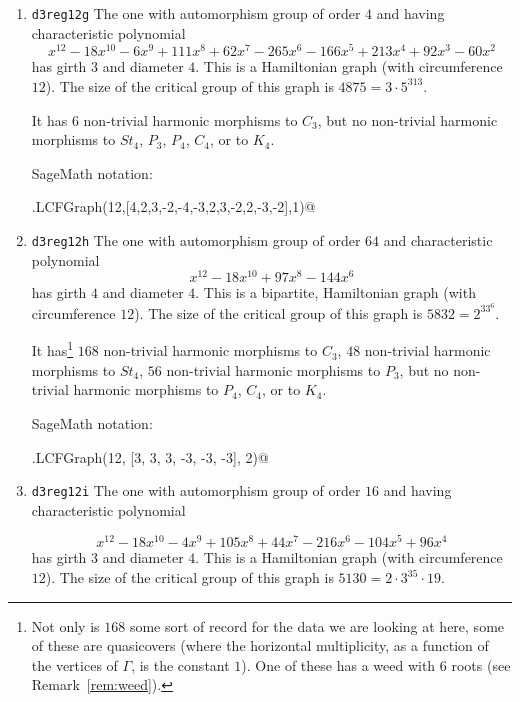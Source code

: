 \documentclass[12pt,letterpaper]{article}
\theoremstyle{definition}
\begin{document}
\begin{enumerate}
SageMath notation:

\verb@graphs.LCFGraph(12,[3,-2,-4,-3,3,3,3,-3,-3,-3,4,2],1)@



\item
  {\tt d3reg12g}\newline %
The one with automorphism group of order $4$ and
having characteristic polynomial  
\[
x^{12} - 18x^{10} - 6x^9 + 111x^8 + 62x^7 - 265x^6 - 166x^5 + 213x^4 + 92x^3 - 60x^2 
\]
has girth $3$ and diameter $4$.
This is a Hamiltonian graph (with circumference $12$).
The size of the critical group of this graph is $4875=3\cdot 5^313$.

It has $6$ non-trivial harmonic morphisms to $C_3$, but no
non-trivial harmonic morphisms to $St_4$, $P_3$, $P_4$, $C_4$, or to $K_4$.

SageMath notation:

\verb@graphs.LCFGraph(12,[4,2,3,-2,-4,-3,2,3,-2,2,-3,-2],1)@


\item
  {\tt d3reg12h}\newline %
The one with automorphism group of order $64$ and
characteristic polynomial  
\[
x^{12} - 18x^{10} + 97x^8  - 144x^6 
\]
has girth $4$ and diameter $4$.
This is a bipartite, Hamiltonian graph (with circumference $12$).
The size of the critical group of this graph is $5832=2^33^6$.

It
has\footnote{Not only is $168$ some sort of record for
  the data we are looking at here, some of these are quasicovers
  (where the horizontal multiplicity, as a function of the
  vertices of $\Gamma$, is the constant $1$). One of these has a weed
  with $6$ roots (see Remark~\ref{rem:weed}).}
$168$ non-trivial harmonic morphisms to $C_3$,
$48$ non-trivial harmonic morphisms to $St_4$,
$56$ non-trivial harmonic morphisms to $P_3$, but no
non-trivial harmonic morphisms to $P_4$, $C_4$, or to $K_4$.

SageMath notation:

\verb@graphs.LCFGraph(12, [3, 3, 3, -3, -3, -3], 2)@


\item
  {\tt d3reg12i}\newline %
The one with automorphism group of order $16$ and
having characteristic polynomial  

\[
x^{12} - 18x^{10} - 4x^9 + 105x^8 + 44x^7 - 216x^6 - 104x^5 + 96x^4 
\]
has girth $3$ and diameter $4$.
This is a Hamiltonian graph (with circumference $12$).
The size of the critical group of this graph is $5130=2\cdot 3^35\cdot 19$.


\end{enumerate}
\end{document}
